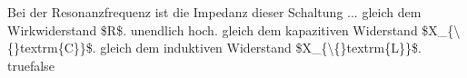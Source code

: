     {Bei der Resonanzfrequenz ist die Impedanz dieser Schaltung ...}
    {gleich dem Wirkwiderstand \$R\$.}
    {unendlich hoch.}
    {gleich dem kapazitiven Widerstand \$X\_\{\textbackslash\{\}textrm\{C\}\}\$.}
    {gleich dem induktiven Widerstand \$X\_\{\textbackslash\{\}textrm\{L\}\}\$.}
    {true}{false}